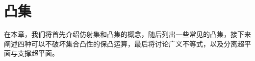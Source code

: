 \chapter{凸集}
在本章，我们将首先介绍仿射集和凸集的概念，随后列出一些常见的凸集，接下来阐述四种可以不破坏集合凸性的保凸运算，最后将讨论广义不等式，以及分离超平面与支撑超平面。






